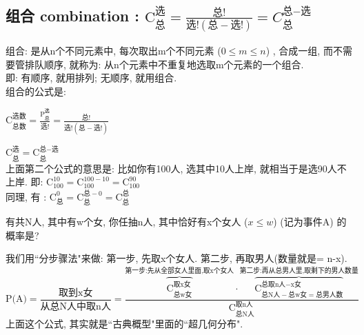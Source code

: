 \documentclass[UTF8]{ctexart}
\begin{document}
	
	
	
	

	\subsection{组合 combination : $
		\text{C}_{\text{总}}^{\text{选}}=\frac{\text{总!}}{\text{选!}\left( \text{总}-\text{选!} \right)}	= C_{\text{总}}^{\text{总}-\text{选}}	$}
	
	组合: 是从n个不同元素中, 每次取出m个不同元素 ($0 \leq m \leq n$) , 合成一组, 而不需要管排队顺序, 就称为: 从n个元素中不重复地选取m个元素的一个组合. \\
	
	即: 有顺序, 就用排列; 无顺序, 就用组合. \\
	
	组合的公式是: 
	
$\boxed{
		\text{C}_{\text{总数}}^{\text{选数}}=\frac{\text{P}_{\text{总}}^{\text{选}}}{\text{选!}}=\frac{\text{总!}}{\text{选!}\left( \text{总}-\text{选!} \right)}	
}$

$\boxed{
		\text{C}_{\text{总}}^{\text{选}}=\text{C}_{\text{总}}^{\text{总}-\text{选}}	
}$ \\

上面第二个公式的意思是: 比如你有100人, 选其中10人上岸, 就相当于是选90人不上岸. 即: $\text{C}_{100}^{10}=\text{C}_{100}^{100-10}=\text{C}_{100}^{90}
$ \\

同理, 有 : $
\boxed{\text{C}_{\text{总}}^{0}=\text{C}_{\text{总}}^{\text{总}-0}=\text{C}_{\text{总}}^{\text{总}}
}$ \\
	
	
	\begin{myEnvSample}
		有共N人, 其中有w个女, 你任抽n人, 其中恰好有x个女人 ($x \leq w$) (记为事件A) 的概率是? 
		
		我们用``分步骤法"来做: 第一步, 先取x个女人. 第二步, 再取男人(数量就是= n-x). \\

$
\text{P(A)}=\dfrac{\text{取到x女}}{\text{从总N人中取n人}}=\dfrac{\overset{\text{第一步:先从全部女人里面,取x个女人}}{\overbrace{\text{C}_{\text{总w女}}^{\text{取x女}}}}\cdot \overset{\text{第二步:再从总男人里,取剩下的男人数量}}{\overbrace{\text{C}_{\text{总N人}-\text{总w女}=\text{总男人数}}^{\text{总取n人}-\text{x女}}}}}{\text{C}_{\text{总N人}}^{\text{取n人}}}
$ \\

上面这个公式, 其实就是``古典概型"里面的``超几何分布".
	\end{myEnvSample}
	\vspace{1em} 
	
\end{document}
